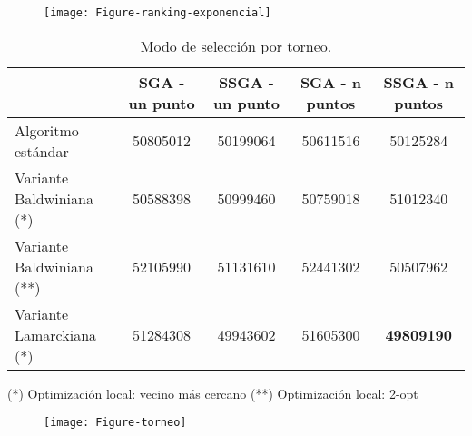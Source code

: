 \documentclass[10pt]{article}
\begin{document}
\begin{figure}[H]
	\begin{center}
 		\texttt{[image: Figure-ranking-exponencial]}
	\end{center} 
\end{figure}


\begin{table}[htb]
\centering
\begin{tabular}{| l | c | c | c | c |}
\hline
& SGA - un punto & SSGA - un punto & SGA - n puntos & SSGA - n puntos \\
\hline
Algoritmo estándar  & 50805012 & 50199064  & 50611516  & 50125284\\ \cline{1-5}
Variante Baldwiniana (*) & 50588398 & 50999460  & 50759018 & 51012340\\ \cline{1-5}
Variante Baldwiniana (**) & 52105990 & 51131610  & 52441302 & 50507962\\ \cline{1-5}
Variante Lamarckiana (*) & 51284308 & 49943602 & 51605300 & \textbf{49809190}\\ 
\hline
\end{tabular}
{    (*) Optimización local: vecino más cercano} 
{    (**) Optimización local: 2-opt} 
\caption{Modo de selección por torneo.}
\end{table}

\begin{figure}[H]
	\begin{center}
 		\texttt{[image: Figure-torneo]}
	\end{center} 
\end{figure}
\end{document}

